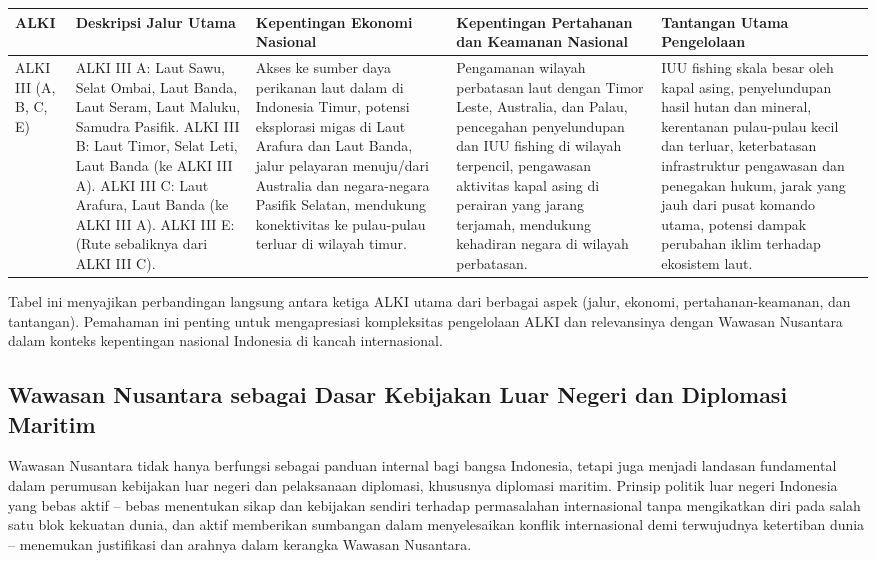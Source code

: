 \documentclass[12pt, a4paper]{article}
\begin{document}
\begin{table}[H]
\centering
\begin{tabular}{|>{\RaggedRight}p{}|>{\RaggedRight}p{}|>{\RaggedRight}p{}|>{\RaggedRight}p{}|>{\RaggedRight}p{}|}
\hline
\textbf{ALKI} & \textbf{Deskripsi Jalur Utama} & \textbf{Kepentingan Ekonomi Nasional} &	\textbf{Kepentingan Pertahanan dan Keamanan Nasional} & \textbf{Tantangan Utama Pengelolaan}\\
\hline
ALKI III (A, B, C, E) &	ALKI III A: Laut Sawu, Selat Ombai, Laut Banda, Laut Seram, Laut Maluku, Samudra Pasifik. ALKI III B: Laut Timor, Selat Leti, Laut Banda (ke ALKI III A). ALKI III C: Laut Arafura, Laut Banda (ke ALKI III A). ALKI III E: (Rute sebaliknya dari ALKI III C). &	Akses ke sumber daya perikanan laut dalam di Indonesia Timur, potensi eksplorasi migas di Laut Arafura dan Laut Banda, jalur pelayaran menuju/dari Australia dan negara-negara Pasifik Selatan, mendukung konektivitas ke pulau-pulau terluar di wilayah timur. &	Pengamanan wilayah perbatasan laut dengan Timor Leste, Australia, dan Palau, pencegahan penyelundupan dan IUU fishing di wilayah terpencil, pengawasan aktivitas kapal asing di perairan yang jarang terjamah, mendukung kehadiran negara di wilayah perbatasan.&	IUU fishing skala besar oleh kapal asing, penyelundupan hasil hutan dan mineral, kerentanan pulau-pulau kecil dan terluar, keterbatasan infrastruktur pengawasan dan penegakan hukum, jarak yang jauh dari pusat komando utama, potensi dampak perubahan iklim terhadap ekosistem laut. \\
\hline
\end{tabular}
\end{table}
Tabel ini menyajikan perbandingan langsung antara ketiga ALKI utama dari berbagai aspek (jalur, ekonomi, pertahanan-keamanan, dan tantangan). Pemahaman ini penting untuk mengapresiasi kompleksitas pengelolaan ALKI dan relevansinya dengan Wawasan Nusantara dalam konteks kepentingan nasional Indonesia di kancah internasional.
\subsection*{Wawasan Nusantara sebagai Dasar Kebijakan Luar Negeri dan Diplomasi Maritim}

Wawasan Nusantara tidak hanya berfungsi sebagai panduan internal bagi bangsa Indonesia, tetapi juga menjadi landasan fundamental dalam perumusan kebijakan luar negeri dan pelaksanaan diplomasi, khususnya diplomasi maritim. Prinsip politik luar negeri Indonesia yang bebas aktif – bebas menentukan sikap dan kebijakan sendiri terhadap permasalahan internasional tanpa mengikatkan diri pada salah satu blok kekuatan dunia, dan aktif memberikan sumbangan dalam menyelesaikan konflik internasional demi terwujudnya ketertiban dunia – menemukan justifikasi dan arahnya dalam kerangka Wawasan Nusantara.  
\end{document}
